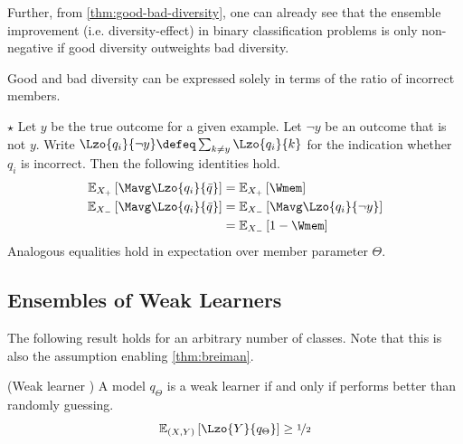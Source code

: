 \documentclass[../main.tex]{subfiles}
\begin{document}
Further, from \cref{thm:good-bad-diversity}, one can already see that the ensemble improvement (i.e. diversity-effect) in binary classification problems is only non-negative if good diversity outweights bad diversity.


Good and bad diversity can be expressed solely in terms of the ratio of incorrect members. 
\begin{lemma} 
    \label{thm:good-bad-diversity-W}
    $\star$ Let $y$ be the true outcome for a given example. Let $\neg y$ be an outcome that is not $y$. Write $\Lzo{q_i}{\neg y} \defeq \sum_{k \not= y} \Lzo{q_i}{k}$ for the indication whether $q_i$ is incorrect. Then the following identities hold.
\begin{align*}
\mathbb{E}_{X_{+}}\left[ \Mavg \Lzo{q_{i}}{\bar{q}} \right] &=
\mathbb{E}_{X_{+}}\left[ \Wmem \right]   \\
\mathbb{E}_{X_{-}}\left[ \Mavg \Lzo{q_{i}}{\bar{q}} \right]  &= \mathbb{E}_{X_{-}}\left[ \Mavg  \Lzo{q_{i}}{\neg y} \right]  \\
&=
\mathbb{E}_{X_{-}}\left[ 1 - \Wmem \right]
\end{align*}
Analogous equalities hold in expectation over member parameter $\Theta$.
\end{lemma}

\subsection{Ensembles of Weak Learners}

The following result holds for an arbitrary number of classes. Note that this is also the assumption enabling \cref{thm:breiman}.

\begin{definition} 
   \label{def:weak-learner}  (Weak learner \cite{theisen_WhenAreEnsembles_2023,wood_BiasVarianceDecompositionsMargin_2022})
   A model $q_{\Theta}$ is a weak learner if and only if performs better than randomly guessing.
$$
\mathbb{E}_{(X,Y) }\left[ \Lzo{Y}{q_{\Theta}} \right] \geq \nicefrac{1}{2}
$$
\end{definition}
\end{document}
